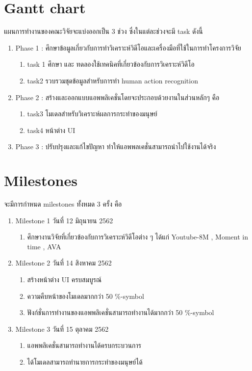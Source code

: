 \section{Gantt chart}แผนการทำงานของคณะวิจัยจะแบ่งออกเป็น 3 ช่วง ซึ่งในแต่ละช่วงจะมี task ดังนี้
\begin{enumerate}
	\item Phase 1 :  ศึกษาข้อมูลเกี่ยวกับการทำวิเคราะห์วิดีโอและเครื่องมือที่ใช้ในการทำโครงการวิจัย
		\begin{enumerate}\setlength\itemsep{-0.25em}
			\item task 1 	ศึกษา และ ทดลองใช้เทคนิคที่เกี่ยวข้องกับการวิเคราะห์วิดีโอ
			\item task2	รวบรวมชุดข้อมูลสำหรับการทำ human action recognition
		\end{enumerate}
	\item Phase 2 :  สร้างและออกแบบแอพพลิเคชั่นโดยจะประกอบด้วยงานในส่วนหลักๆ คือ
		\begin{enumerate}\setlength\itemsep{-0.25em}
			\item task3	โมเดลสำหรับวิเคราะห์ผลการกระทำของมนุษย์
			\item task4	หน้าต่าง UI
		\end{enumerate}
	\item Phase 3 : ปรับปรุงและแก้ไขปัญหา ทำให้แอพพลเคชั่นสามารถนำไปใช้งานได้จริง
\end{enumerate}

\section{Milestones}จะมีการกำหนด milestones ทั้งหมด 3 ครั้ง คือ
\begin{enumerate}
	\item Milestone  1  วันที่ 12  มิถุนายน  2562
		\begin{enumerate}\setlength\itemsep{-0.25em}
			\item ศึกษางานวิจัยที่เกี่ยวข้องกับการวิเคราะห์วิดีโอต่าง ๆ  ได้แก่ Youtube-8M , Moment in time , AVA
		\end{enumerate}
	\item Milestone  2  วันที่ 14  สิงหาคม 2562
		\begin{enumerate}\setlength\itemsep{-0.25em}
			\item สร้างหน้าต่าง UI ครบสมบูรณ์
			\item ความคืบหน้าของโมเดลมากกว่า 50 \%-symbol
			\item ฟังก์ชั่นการทำงานของแอพพลิเคชั่นสามารถทำงานได้มากกว่า 50 \%-symbol
		\end{enumerate}
	\item Milestone  3  วันที่ 15  ตุลาคม 2562
		\begin{enumerate}\setlength\itemsep{-0.25em}
			\item แอพพลิเคชั่นสามารถทำงานได้ครบกระบวนการ
			\item ได้โมเดลสามารถทำนายการกระทำของมนุษย์ได้
		\end{enumerate}
\end{enumerate}



